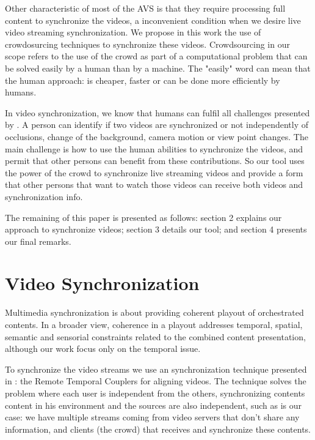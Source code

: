 \documentclass{sig-alternate-05-2015}
\begin{document}
Other characteristic of most of the AVS is that they require processing full content to synchronize the videos, a inconvenient condition when we desire live video streaming synchronization. We propose in this work the use of crowdosurcing techniques to synchronize these videos. Crowdsourcing \cite{howe2006rise} in our scope refers to the use of the crowd as part of a computational problem that can be solved easily by a human than by a machine. The "easily" word can mean that the human approach: is cheaper, faster or can be done more efficiently by humans.

In video synchronization, we know that humans can fulfil all challenges presented by \cite{ schweiger2013fully}. A person can identify if two videos are synchronized or not independently of occlusions, change of the background, camera motion or view point changes. The main challenge is how to use the human abilities to synchronize the videos, and permit that other persons can benefit from these contributions. So our tool uses the power of the crowd to synchronize live streaming videos and provide a form that other persons that want to watch those videos can receive both videos and synchronization info.

The remaining of this paper is presented as follows: section 2 explains our approach to synchronize videos; section 3 details our tool; and section 4 presents our final remarks.

\section{Video Synchronization}
Multimedia synchronization is about providing coherent playout of orchestrated contents. In a broader view, coherence in a playout addresses temporal, spatial, semantic and sensorial constraints related to the combined content presentation, although our work focus only on the temporal issue.

To synchronize the video streams we use an synchronization technique presented in \cite{segundo2015remote}: the Remote Temporal Couplers for aligning videos. The technique solves the problem where each user is independent from the others, synchronizing contents content in his environment and the sources are also independent, such as is our case: we have multiple streams coming from video servers that don't share any information, and clients (the crowd) that receives and synchronize these contents.
\end{document}
